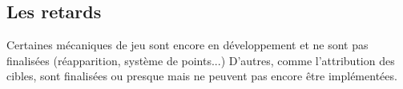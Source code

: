 \subsection{Les retards}

Certaines mécaniques de jeu sont encore en développement et ne sont pas finalisées (réapparition, système de points...)
D'autres, comme l'attribution des cibles, sont finalisées ou presque mais ne peuvent pas encore être implémentées.
    
